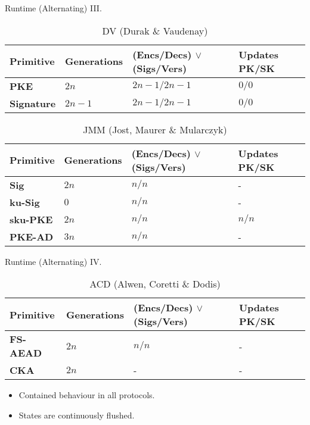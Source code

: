\documentclass{beamer}
\begin{document}
\begin{frame}{Runtime (Alternating) III.}
  \scriptsize
  \begin{table}
    \caption*{DV (Durak \& Vaudenay)}
    \begin{tabular}{ | l | l | l | l |}
    \hline
    Primitive & Generations & (Encs/Decs) $\vee$ (Sigs/Vers) & Updates PK/SK \\ \hline
    \textbf{PKE} & $2n$ & $2n-1/2n-1$ & $0/0$ \\ \hline
    \textbf{Signature} & $2n-1$ & $2n-1/2n-1$ & $0/0$ \\  
    \hline
    \end{tabular}
  \end{table}

  \begin{table}
    \caption*{JMM (Jost, Maurer \& Mularczyk)}
    \begin{tabular}{ | l | l | l | l |}
    \hline
    Primitive & Generations & (Encs/Decs) $\vee$ (Sigs/Vers) & Updates PK/SK \\ \hline
    \textbf{Sig} & $2n$ & $n/n$ & - \\ \hline
    \textbf{ku-Sig} & $0$ & $n/n$ & - \\ \hline
    \textbf{sku-PKE} & $2n$ & $n/n$ & $n/n$ \\ \hline
    \textbf{PKE-AD} & $3n$ & $n/n$ & - \\
    \hline
    \end{tabular}
  \end{table}
\end{frame}

\begin{frame}{Runtime (Alternating) IV.}
  \scriptsize
  \begin{table}
    \caption*{ACD (Alwen, Coretti \& Dodis)}
    \begin{tabular}{ | l | l | l | l |}
      \hline
      Primitive & Generations & (Encs/Decs) $\vee$ (Sigs/Vers) & Updates PK/SK \\ \hline
      \textbf{FS-AEAD} & $2n$ & $n/n$ & - \\ \hline
      \textbf{CKA} & $2n$ & - & - \\  
      \hline
    \end{tabular}
  \end{table}
  \normalsize
  \begin{itemize}
  \item Contained behaviour in all protocols.
  \item States are continuously flushed.
  \end{itemize}
\end{frame}
\end{document}
